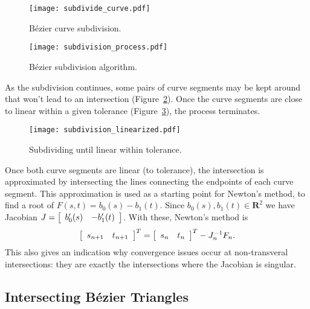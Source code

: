 \documentclass[letterpaper,10pt]{article}
\theoremstyle{definition}
\newcommand{\reals}{\mathbf{R}}
\begin{document}
\begin{figure}
  \texttt{[image: subdivide\_curve.pdf]}
  \centering
  \captionsetup{width=.75\linewidth}
  \caption{B\'{e}zier curve subdivision.}
  \label{fig:bezier-curve-subdivision}
\end{figure}

\begin{figure}
  \texttt{[image: subdivision\_process.pdf]}
  \centering
  \captionsetup{width=.75\linewidth}
  \caption{B\'{e}zier subdivision algorithm.}
  \label{fig:bezier-subdivision-process}
\end{figure}

As the subdivision continues,
some pairs of curve segments may be kept around that won't lead to an
intersection (Figure~\ref{fig:bezier-subdivision-process}).
Once the curve segments are close to linear within a given tolerance
(Figure~\ref{fig:bezier-subdivision-linearized}), the process
terminates.

\begin{figure}
  \texttt{[image: subdivision\_linearized.pdf]}
  \centering
  \captionsetup{width=.75\linewidth}
  \caption{Subdividing until linear within tolerance.}
  \label{fig:bezier-subdivision-linearized}
\end{figure}

Once both curve segments are linear (to tolerance), the intersection is
approximated by intersecting the lines connecting the endpoints of each
curve segment. This approximation is used as a starting point for Newton's
method, to find a root of \(F(s, t) = b_0(s) - b_1(t)\). Since
\(b_0(s), b_1(t) \in \reals^2\) we have Jacobian \(J =
\left[ \begin{array}{c c} b_0'(s) & -b_1'(t) \end{array}\right]\).
With these, Newton's method is
\begin{equation}
\left[ \begin{array}{c c} s_{n + 1} & t_{n + 1} \end{array}\right]^T =
\left[ \begin{array}{c c} s_n & t_n \end{array}\right]^T -
J_n^{-1} F_n.
\end{equation}
This also gives an indication why convergence issues occur at non-transveral
intersections: they are exactly the intersections where the Jacobian is
singular.

\subsection{Intersecting B\'{e}zier Triangles}\label{subsec:intersect-bez-tri}
\end{document}
